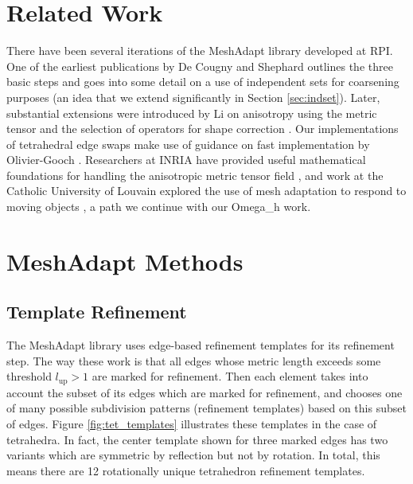 \section{Related Work}

There have been several iterations of the MeshAdapt
library developed at RPI.
One of the earliest publications by De Cougny and Shephard
\cite{de1999parallel} outlines the three basic steps and goes into some detail
on a use of independent sets for coarsening purposes
(an idea that we extend significantly in Section \ref{sec:indset}).
Later, substantial extensions were introduced by Li on anisotropy using the metric
tensor and the selection of operators for shape correction
\cite{li20053d,li2003mesh}.
Our implementations of tetrahedral edge swaps make use
of guidance on fast implementation by Olivier-Gooch \cite{freitag1997tetrahedral}.
Researchers at INRIA have provided useful mathematical foundations
for handling the anisotropic metric tensor field
\cite{frey2005,alauzet2006parallel,loseille2015parallel},
and work at the Catholic University of Louvain explored
the use of mesh adaptation to respond to moving objects
\cite{compere2010mesh}, a path we continue with our Omega\_h work.

\section{MeshAdapt Methods}
\label{sec:ma_methods}

\subsection{Template Refinement}
\label{sec:ma_refine}

The MeshAdapt library uses edge-based refinement templates for its refinement step.
The way these work is that all edges whose metric length exceeds some threshold
$l_{\text{up}} > 1$ are marked for refinement.
Then each element takes into account the subset of its edges which are marked
for refinement, and chooses one of many possible subdivision patterns
(refinement templates) based on this subset of edges.
Figure \ref{fig:tet_templates} illustrates these templates in the case of tetrahedra.
In fact, the center template shown for three marked edges has two variants which
are symmetric by reflection but not by rotation.
In total, this means there are 12 rotationally unique tetrahedron refinement templates.

